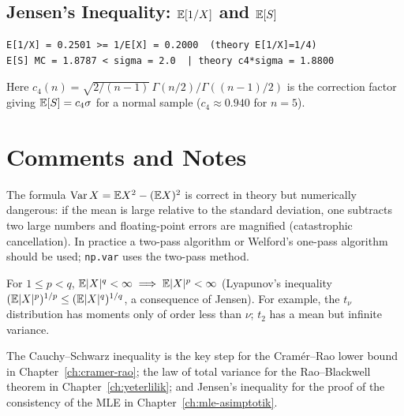 \documentclass[main.tex]{subfiles}
\begin{document}
\subsection{Jensen's Inequality: $\mathbb{E}[1/X]$ and $\mathbb{E}[S]$}

\begin{lstlisting}[style=output]
E[1/X] = 0.2501 >= 1/E[X] = 0.2000  (theory E[1/X]=1/4)
E[S] MC = 1.8787 < sigma = 2.0  | theory c4*sigma = 1.8800
\end{lstlisting}

Here $c_4(n)=\sqrt{2/(n-1)}\,\Gamma(n/2)/\Gamma((n-1)/2)$ is the correction factor giving $\mathbb{E}[S]=c_4\sigma$ for a normal sample ($c_4\approx0.940$ for $n=5$).

\section{Comments and Notes}

\begin{remark}
The formula $\operatorname{Var} X=\mathbb{E} X^2-(\mathbb{E} X)^2$ is correct in theory but numerically dangerous: if the mean is large relative to the standard deviation, one subtracts two large numbers and floating-point errors are magnified (catastrophic cancellation). In practice a two-pass algorithm or Welford's one-pass algorithm should be used; \texttt{np.var} uses the two-pass method.
\end{remark}

\begin{remark}
For $1\le p<q$, $\mathbb{E}|X|^q<\infty\implies\mathbb{E}|X|^p<\infty$ (Lyapunov's inequality $(\mathbb{E}|X|^p)^{1/p}\le(\mathbb{E}|X|^q)^{1/q}$, a consequence of Jensen). For example, the $t_\nu$ distribution has moments only of order less than $\nu$; $t_2$ has a mean but infinite variance.
\end{remark}

\begin{remark}
The Cauchy--Schwarz inequality is the key step for the Cramér--Rao lower bound in Chapter~\ref{ch:cramer-rao}; the law of total variance for the Rao--Blackwell theorem in Chapter~\ref{ch:yeterlilik}; and Jensen's inequality for the proof of the consistency of the MLE in Chapter~\ref{ch:mle-asimptotik}.
\end{remark}
\end{document}
